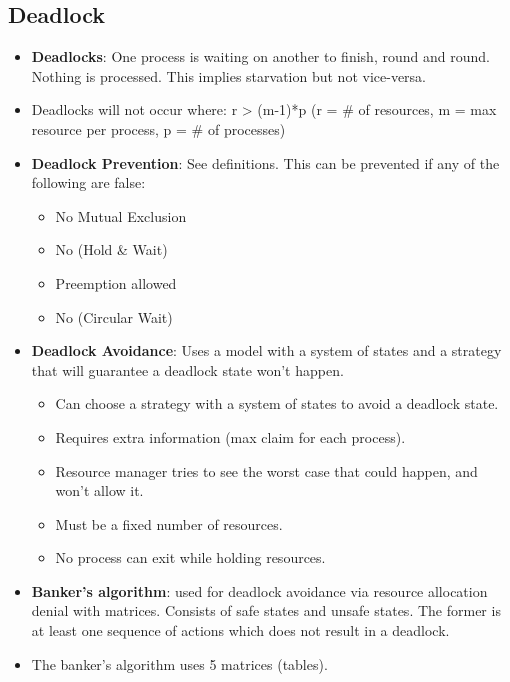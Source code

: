 \documentclass[fontsize=5pt]{scrartcl}
\begin{document}
\begin{multicols}{3}
       \subsection{Deadlock}
         \begin{itemize}
          \item \textbf{Deadlocks}: One process is waiting on another to finish, round and round. Nothing is processed. This implies starvation but not vice-versa.
          \item Deadlocks will not occur where: r > (m-1)*p (r = # of resources, m = max resource per process, p = # of processes)
          \item \textbf{Deadlock Prevention}: See definitions. This can be prevented if any of the following are false:
          \begin{itemize}
            \item No Mutual Exclusion
            \item No (Hold \& Wait)
            \item Preemption allowed
            \item No (Circular Wait)
          \end{itemize}
           \item \textbf{Deadlock Avoidance}: Uses a model with a system of states and a strategy that will guarantee a deadlock state won't happen.
           \begin{itemize}
             \item Can choose a strategy with a system of states to avoid a deadlock state.
             \item Requires extra information (max claim for each process).
             \item Resource manager tries to see the worst case that could happen, and won't allow it.
             \item Must be a fixed number of resources.
             \item No process can exit while holding resources.
           \end{itemize}
           \item \textbf{Banker's algorithm}: used for deadlock avoidance via resource allocation denial with matrices. Consists of safe states and unsafe states.
                 The former is at least one sequence of actions which does not result in a deadlock.
           \item The banker's algorithm uses 5 matrices (tables).
           \begin{itemize}

\end{itemize}
\end{itemize}
\end{multicols}
\end{document}
